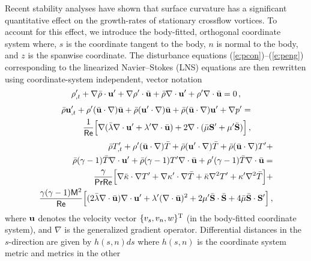 Recent stability analyses \cite{MaMa:94,MaBa:93} have shown that surface
curvature has a significant quantitative effect on the growth-rates of
stationary crossflow vortices.  To account for this effect, we introduce the
body-fitted, orthogonal coordinate system where, $s$ is the coordinate tangent
to the body, $n$ is normal to the body, and $z$ is the spanwise coordinate.
The disturbance equations (\ref{e:pcon})--(\ref{e:peng}) corresponding to the
linearized Navier--Stokes (LNS) equations are then rewritten using
coordinate-system independent, vector notation
%
\begin{equation} \label{e:vcon}
  \rho'_{,t} + \nabla \bar \rho \cdot {\bf u}' + \nabla \rho' \cdot {\bar{{\bf u}}} +
  \bar \rho \nabla \cdot {\bf u}' + \rho' \nabla \cdot {\bar{{\bf u}}} = 0 {\, ,}
\end{equation}
%
\begin{eqnarray} \label{e:vmom}
  \bar \rho {\bf u}'_{,t} + \rho' ( {\bar{{\bf u}}} \cdot \nabla ) {\bar{{\bf u}}} + 
  \bar \rho ( {\bf u}' \cdot \nabla ) {\bar{{\bf u}}} + \bar \rho ( {\bar{{\bf u}}} \cdot \nabla ) {\bf u}' +
  \nabla p' = \\ \nonumber 
  \frac{1}{{\sf Re}}\Big[ \nabla ( \bar\lambda \nabla \cdot {\bf u}' +
                              \lambda' \nabla \cdot {\bar{{\bf u}}} ) + 
                   2 \nabla \cdot ( \bar\mu {\bf S'} + 
		                    \mu' \bar{\bf S} ) \Big] {\, ,}
\end{eqnarray}
%
\begin{eqnarray} \label{e:veng}
  \bar \rho T'_{,t} + \rho' ( {\bar{{\bf u}}} \cdot \nabla ) \bar T + 
  \bar \rho ( {\bf u}' \cdot \nabla ) \bar T + \bar \rho ( {\bar{{\bf u}}} \cdot \nabla ) T' + 
  \\ \nonumber \bar \rho(\gamma-1) \bar T \nabla \cdot {\bf u}' + 
  \bar \rho (\gamma-1) T' \nabla \cdot {\bar{{\bf u}}} + 
  \rho' (\gamma-1) \bar T \nabla \cdot {\bar{{\bf u}}} = \\ \nonumber
  \frac{\gamma}{{\sf Pr}{\sf Re}} \Big[ \nabla\bar\kappa \cdot \nabla T' +
  \nabla\kappa' \cdot \nabla\bar T + \bar\kappa\nabla^2 T' + 
  \kappa'\nabla^2\bar T \Big] + \\ \nonumber
  \frac{\gamma(\gamma-1){\sf M}^2}{{\sf Re}} \Big[ (2 \bar\lambda \nabla \cdot {\bar{{\bf u}}})
  \nabla \cdot {\bf u}' + \lambda' (\nabla \cdot {\bar{{\bf u}}})^2 + 
  2 \mu' \bar{\bf S} \cdot \bar{\bf S} + 
  4 \bar\mu \bar{\bf S} \cdot {\bf S'} \Big] {\, ,}
\end{eqnarray}
%
where ${\bf u}$ denotes the velocity vector $\{v_s,v_n,w\}^{\rm T}$ (in the
body-fitted coordinate system), and $\nabla$ is the generalized gradient
operator.  Differential distances in the $s$-direction are given by $h(s,n)
ds$ where $h(s,n)$ is the coordinate system metric and metrics in the other
